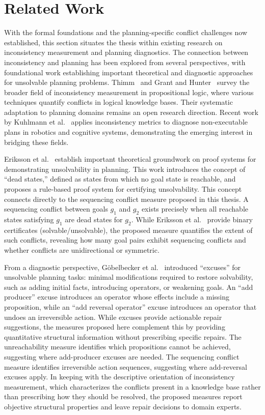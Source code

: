 \section{Related Work}
\label{sec:related_work}

With the formal foundations and the planning-specific conflict challenges now established, this section situates the thesis within existing research on inconsistency measurement and planning diagnostics. The connection between inconsistency and planning has been explored from several perspectives, with foundational work establishing important theoretical and diagnostic approaches for unsolvable planning problems. Thimm~\cite{Thimm2019} and Grant and Hunter~\cite{Grant2023} survey the broader field of inconsistency measurement in propositional logic, where various techniques quantify conflicts in logical knowledge bases. Their systematic adaptation to planning domains remains an open research direction. Recent work by Kuhlmann et al.~\cite{Kuhlmann2025a} applies inconsistency metrics to diagnose non-executable plans in robotics and cognitive systems, demonstrating the emerging interest in bridging these fields.

Eriksson et al.~\cite{Eriksson2018} establish important theoretical groundwork on proof systems for demonstrating unsolvability in planning. This work introduces the concept of ``dead states,'' defined as states from which no goal state is reachable, and proposes a rule-based proof system for certifying unsolvability. This concept connects directly to the sequencing conflict measure proposed in this thesis. A sequencing conflict between goals $g_1$ and $g_2$ exists precisely when all reachable states satisfying $g_1$ are dead states for $g_2$. While Eriksson et al.~\cite{Eriksson2018} provide binary certificates (solvable/unsolvable), the proposed measure quantifies the extent of such conflicts, revealing how many goal pairs exhibit sequencing conflicts and whether conflicts are unidirectional or symmetric.

From a diagnostic perspective, G{\"o}belbecker et al.~\cite{Goebelbecker2010} introduced ``excuses'' for unsolvable planning tasks: minimal modifications required to restore solvability, such as adding initial facts, introducing operators, or weakening goals. An ``add producer'' excuse introduces an operator whose effects include a missing proposition, while an ``add reversal operator'' excuse introduces an operator that undoes an irreversible action. While excuses provide actionable repair suggestions, the measures proposed here complement this by providing quantitative structural information without prescribing specific repairs. The unreachability measure identifies which propositions cannot be achieved, suggesting where add-producer excuses are needed. The sequencing conflict measure identifies irreversible action sequences, suggesting where add-reversal excuses apply. In keeping with the descriptive orientation of inconsistency measurement, which characterizes the conflicts present in a knowledge base rather than prescribing how they should be resolved, the proposed measures report objective structural properties and leave repair decisions to domain experts.

